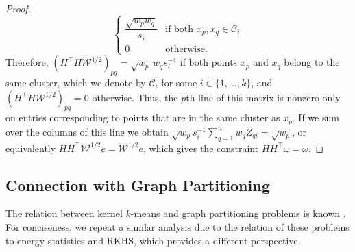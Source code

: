 \documentclass[aps,preprint,nofootinbib,floatfix]{revtex4-1}
\newcommand\C{{\mathcal{C}}}
\newcommand\e{e}
\newcommand\om{\omega}
\begin{document}
\begin{proof}
\begin{equation}
\begin{cases}
\dfrac{\sqrt{w_p w_q}}{s_i} & \mbox{if both $x_p,x_q \in \C_i$} \\
0 & \mbox{otherwise}.
\end{cases}
\end{equation}
Therefore, $(H^\top H \mathcal{W}^{1/2})_{pq} = \sqrt{w_p} \, w_q s_i^{-1}$
if both points $x_p$ and $x_q$ belong to the same cluster, which
we denote by $\C_i$ for some $i\in\{1,\dotsc,k\}$, and 
$(H^\top H \mathcal{W}^{1/2})_{pq} = 0 $ otherwise. Thus, the $p$th
line of this matrix is nonzero only on entries corresponding to points
that are in the same cluster as $x_p$. If we sum over the columns of this
line we obtain $\sqrt{w_p} s_i^{-1} \sum_{q=1}^n w_q Z_{qi} = \sqrt{w_p}$,
or equivalently $H H^\top \mathcal{W}^{1/2} \e = \mathcal{W}^{1/2} \e$,
which gives the constraint $H H^\top \om = \om$.
\end{proof}


\subsection*{Connection with Graph Partitioning}

The relation between kernel $k$-means and graph partitioning problems
is known \cite{Dhillon2,Dhillon}. For conciseness, we repeat a similar 
analysis due to the relation of these problems to
energy statistics and RKHS, which  provides a different perspective.
\end{document}

